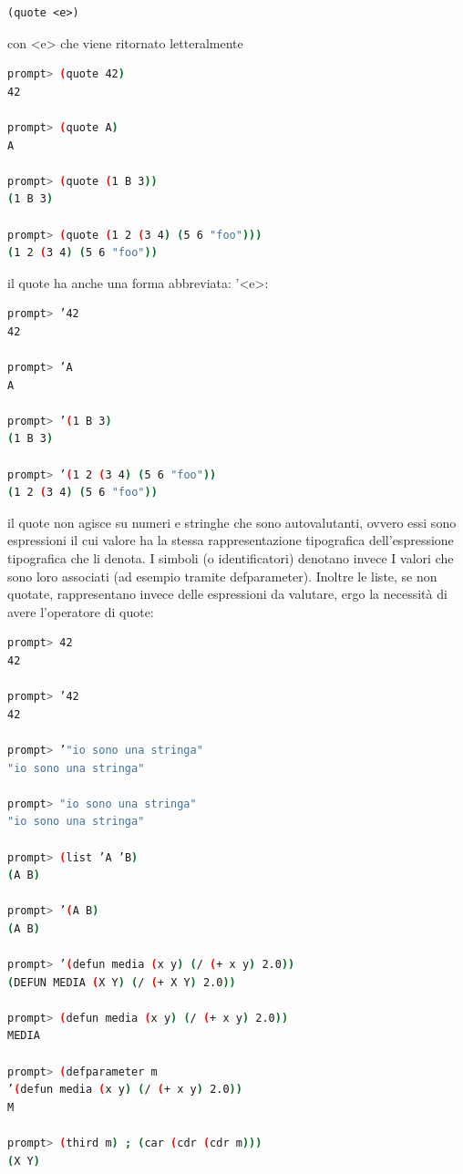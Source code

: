 \documentclass[a4paper,12pt, oneside]{book}
\begin{document}
\begin{verbatim}
(quote <e>)
\end{verbatim}
con <e> che viene ritornato letteralmente
\begin{shaded}
\begin{lstlisting}[language=bash]
prompt> (quote 42)
42

prompt> (quote A)
A

prompt> (quote (1 B 3))
(1 B 3)

prompt> (quote (1 2 (3 4) (5 6 "foo")))
(1 2 (3 4) (5 6 "foo"))
\end{lstlisting}
\end{shaded}
il quote ha anche una forma abbreviata: '<e>:
\begin{shaded}
\begin{lstlisting}[language=bash]
prompt> ’42 
42

prompt> ’A
A

prompt> ’(1 B 3)
(1 B 3)

prompt> ’(1 2 (3 4) (5 6 "foo"))
(1 2 (3 4) (5 6 "foo"))
\end{lstlisting}
\end{shaded}
il quote non agisce su numeri e stringhe che sono autovalutanti, ovvero essi sono
espressioni il cui valore ha la stessa rappresentazione tipografica dell'espressione
tipografica che li denota. I simboli (o identificatori) denotano invece I valori che sono loro associati (ad
esempio tramite defparameter). Inoltre le liste, se non quotate, rappresentano invece delle espressioni da valutare, ergo la
necessità di avere l’operatore di quote:
\begin{shaded}
\begin{lstlisting}[language=bash]
prompt> 42
42

prompt> ’42
42

prompt> ’"io sono una stringa"
"io sono una stringa"

prompt> "io sono una stringa"
"io sono una stringa"

prompt> (list ’A ’B)
(A B)

prompt> ’(A B)
(A B)

prompt> ’(defun media (x y) (/ (+ x y) 2.0))
(DEFUN MEDIA (X Y) (/ (+ X Y) 2.0))

prompt> (defun media (x y) (/ (+ x y) 2.0))
MEDIA

prompt> (defparameter m
’(defun media (x y) (/ (+ x y) 2.0))
M

prompt> (third m) ; (car (cdr (cdr m)))
(X Y)
\end{lstlisting}
\end{shaded} 
\end{document}
